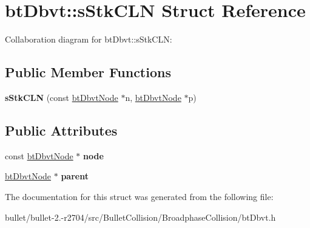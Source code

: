 \hypertarget{structbt_dbvt_1_1s_stk_c_l_n}{\section{bt\+Dbvt\+:\+:s\+Stk\+C\+L\+N Struct Reference}
\label{structbt_dbvt_1_1s_stk_c_l_n}
}


Collaboration diagram for bt\+Dbvt\+:\+:s\+Stk\+C\+L\+N\+:
\subsection*{Public Member Functions}
\begin{DoxyCompactItemize}
\item 
\hypertarget{structbt_dbvt_1_1s_stk_c_l_n_accb54443392bb16ff797918476843736}{{\bfseries s\+Stk\+C\+L\+N} (const \hyperlink{structbt_dbvt_node}{bt\+Dbvt\+Node} $\ast$n, \hyperlink{structbt_dbvt_node}{bt\+Dbvt\+Node} $\ast$p)}\label{structbt_dbvt_1_1s_stk_c_l_n_accb54443392bb16ff797918476843736}

\end{DoxyCompactItemize}
\subsection*{Public Attributes}
\begin{DoxyCompactItemize}
\item 
\hypertarget{structbt_dbvt_1_1s_stk_c_l_n_ab5c7573995b03fbac8d503a585623031}{const \hyperlink{structbt_dbvt_node}{bt\+Dbvt\+Node} $\ast$ {\bfseries node}}\label{structbt_dbvt_1_1s_stk_c_l_n_ab5c7573995b03fbac8d503a585623031}

\item 
\hypertarget{structbt_dbvt_1_1s_stk_c_l_n_a7a695c1be5482ea13e84a2c9f8c77933}{\hyperlink{structbt_dbvt_node}{bt\+Dbvt\+Node} $\ast$ {\bfseries parent}}\label{structbt_dbvt_1_1s_stk_c_l_n_a7a695c1be5482ea13e84a2c9f8c77933}

\end{DoxyCompactItemize}


The documentation for this struct was generated from the following file\+:\begin{DoxyCompactItemize}
\item 
bullet/bullet-\/2.-\/r2704/src/\+Bullet\+Collision/\+Broadphase\+Collision/bt\+Dbvt.\+h\end{DoxyCompactItemize}
